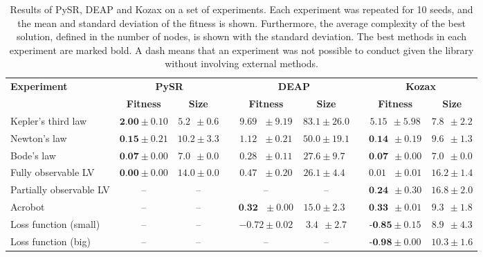 \documentclass{article}
\begin{document}
\begin{table}[!t]
\centering
  \begin{small}
    \begin{tabular}{lcccccccc}
    \toprule
     \textbf{Experiment}& \multicolumn{2}{c}{\textbf{PySR}} & &\multicolumn{2}{c}{\textbf{DEAP}} &&\multicolumn{2}{c}{\textbf{Kozax}}\\
    \cline{2-3}\cline{5-6}\cline{8-9}& \textbf{Fitness} & \textbf{Size} &  & \textbf{Fitness} & \textbf{Size} & & \textbf{Fitness} & \textbf{Size} \\
    \midrule
       Kepler's third law & $\textbf{2.00}\pm0.10$&$5.2\:\:\pm0.6$ &&$9.69\:\:\:\pm9.19$&$83.1\pm26.0$& &$5.15\:\:\pm5.98$&$7.8\:\:\pm2.2$\\
       Newton's law & $\textbf{0.15}\pm0.21$&$10.2\pm3.3$&&$1.12\:\:\:\pm0.21$& $50.0\pm19.1$&&$\textbf{0.14}\:\:\pm0.19$&$9.6\:\:\pm1.3$\\
       Bode's law & $\textbf{0.07}\pm0.00$&$7.0\:\:\pm0.0$&& $0.28\:\:\:\pm0.11$& $27.6\pm  9.7\:\:$&&$ \textbf{0.07}\:\:\pm0.00$&$7.0\:\:\pm0.0$\\
       Fully observable LV &$\textbf{0.00}\pm0.00$ &$14.0\pm0.0$&&$0.47\:\:\:\pm0.20$&$26.1\pm4.4\:\:$&&$0.01\:\:\:\pm0.01$&$16.2\pm1.4$\\
        Partially observable LV & -- & \:\:--&&\:\:\:--&--&&$\textbf{0.24}\:\:\pm0.30$&$16.8\pm2.0$ \\
       Acrobot & -- &\:\:--&&$\textbf{0.32}\:\:\:\pm0.00$&$15.0\pm2.3\:\:$&&$\textbf{0.33}\:\:\pm0.01$&$9.3\:\:\pm1.8$\\
       Loss function (small) & -- & \:\:-- && $-0.72\pm0.02$&$3.4\:\:\pm2.7$\:\:&&$\textbf{-0.85}\pm0.15$&$8.9\:\:\pm4.3$\\
       Loss function (big) & -- & \:\:-- && \:\:\:-- & -- & &$\textbf{-0.98}\pm0.00$&$10.3\pm1.6$\\
       \bottomrule
    \end{tabular}
    \caption{Results of PySR, DEAP and Kozax on a set of experiments. Each experiment was repeated for 10 seeds, and the mean and standard deviation of the fitness is shown. Furthermore, the average complexity of the best solution, defined in the number of nodes, is shown with the standard deviation. The best methods in each experiment are marked bold. A dash means that an experiment was not possible to conduct given the library without involving external methods.}
    \label{tab:comparison}
    \end{small}
\end{table}
\end{document}
